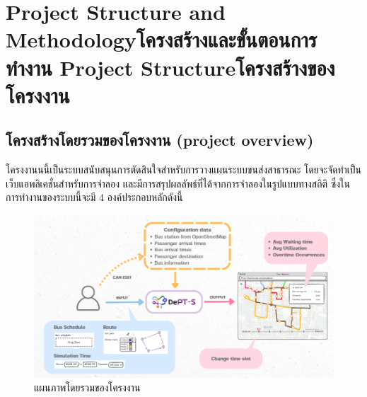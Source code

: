 \chapter{\ifproject%
\ifenglish Project Structure and Methodology\else โครงสร้างและขั้นตอนการทำงาน\fi
\else%
\ifenglish Project Structure\else โครงสร้างของโครงงาน\fi
\fi
}

\makeatletter


\makeatother

\section{โครงสร้างโดยรวมของโครงงาน (project overview) }
\begin{mypara}
    \indent โครงงานนนี้เป็นระบบสนับสนุนการตัดสินใจสำหรับการวางแผนระบบขนส่งสาธารณะ 
    โดยจะจัดทำเป็นเว็บแอพลิเคชั่นสำหรับการจำลอง และมีการสรุปผลลัพธ์ที่ได้จากการจำลองในรูปแบบทางสถิติ
    ซึ่งในการทำงานของระบบนี้จะมี 4 องค์ประกอบหลักดังนี้  
    
\end{mypara}

\begin{figure}
\includegraphics[width=\textwidth,height=0.9\textheight,keepaspectratio]{overview.png}
\caption[Poem]{แผนภาพโดยรวมของโครงงาน}
\label{fig:overview}
\end{figure}

